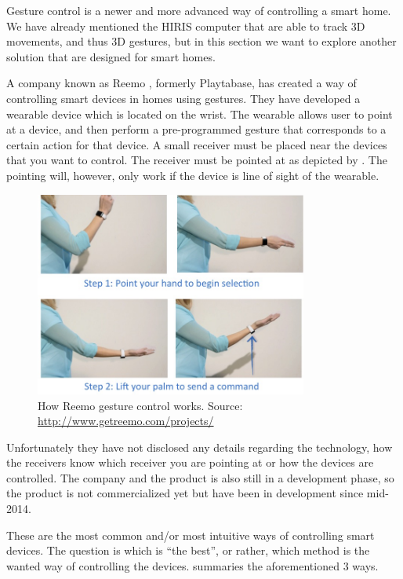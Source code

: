 Gesture control is a newer and more advanced way of controlling a smart home. 
We have already mentioned the HIRIS computer that are able to track 3D movements, and thus 3D gestures, 
but in this section we want to explore another solution that are designed for smart homes. 

A company known as Reemo \cite{Reemo}, formerly Playtabase, 
has created a way of controlling smart devices in homes using gestures. 
They have developed a wearable device which is located on the wrist. 
The wearable allows user to point at a device, 
and then perform a pre-programmed gesture that corresponds to a certain action for that device. 
A small receiver must be placed near the devices that you want to control. 
The receiver must be pointed at as depicted by .
The pointing will, however, only work if the device is line of sight of the wearable. 

\begin{figure}[!htb]
    \centering
    \includegraphics[width=0.8\textwidth]{images/Reemo}
    \caption{How Reemo gesture control works. Source: \url{http://www.getreemo.com/projects/}}
    \label{fig:reemo}
\end{figure}

Unfortunately they have not disclosed any details regarding the technology, 
how the receivers know which receiver you are pointing at or how the devices are controlled. 
The company and the product is also still in a development phase, 
so the product is not commercialized yet but have been in development since mid-2014.

These are the most common and/or most intuitive ways of controlling smart devices. 
The question is which is ``the best'', or rather, which method is the wanted way of controlling the devices.
 summaries the aforementioned 3 ways. 

